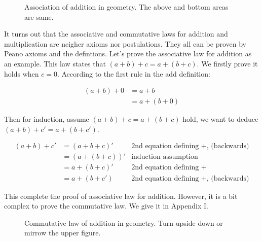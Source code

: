 \documentclass[UTF8]{article}
\begin{document}
\begin{wrapfigure}{R}{0.4\textwidth}
\centering
{}
\caption{Association of addition in geometry. The above and bottom areas are same.}
\end{wrapfigure}

It turns out that the associative and commutative laws for addition and multiplication are neigher axioms nor postulations. They all can be proven by Peano axioms and the defintions. Let's prove the associative law for addition as an example. This law states that $(a + b) + c= a + (b + c)$. We firstly prove it holds when $c=0$. According to the first rule in the add definition:

\[
\begin{array}{rl}
(a + b) + 0 & = a + b \\
            & = a + (b + 0)
\end{array}
\]

Then for induction, assume $(a + b) + c = a + (b + c)$ hold, we want to deduce $(a + b) + c' = a + (b + c')$.

\[
\begin{array}{rlr}
(a + b) + c' & = (a + b + c)' & \text{2nd equation defining +, (backwards)} \\
             & = (a + (b + c))' & \text{induction assumption} \\
             & = a + (b + c)' & \text{2nd equation defining +} \\
             & = a + (b + c') & \text{2nd equation defining +, (backwards)}
\end{array}
\]

This complete the proof of associative law for addition. However, it is a bit complex to prove the commutative law. We give it in Appendix I.

\begin{figure}[htbp]
\centering
{}
\caption{Commutative law of addition in geometry. Turn upside down or mirrow the upper figure.}
\end{figure}
\end{document}

